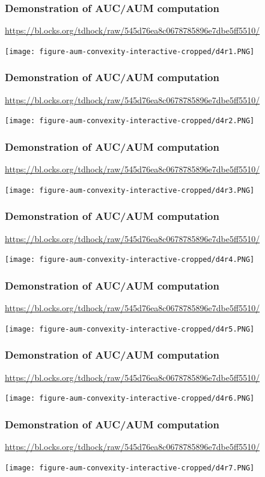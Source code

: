 \documentclass[t]{beamer}
\begin{document}
\begin{frame}
  \frametitle{Demonstration of AUC/AUM computation}
  {\scriptsize\url{https://bl.ocks.org/tdhock/raw/545d76ea8c0678785896e7dbe5ff5510/}}

  \texttt{[image: figure-aum-convexity-interactive-cropped/d4r1.PNG]}
\end{frame}

\begin{frame}
  \frametitle{Demonstration of AUC/AUM computation}
  {\scriptsize\url{https://bl.ocks.org/tdhock/raw/545d76ea8c0678785896e7dbe5ff5510/}}

  \texttt{[image: figure-aum-convexity-interactive-cropped/d4r2.PNG]}
\end{frame}

\begin{frame}
  \frametitle{Demonstration of AUC/AUM computation}
  {\scriptsize\url{https://bl.ocks.org/tdhock/raw/545d76ea8c0678785896e7dbe5ff5510/}}

  \texttt{[image: figure-aum-convexity-interactive-cropped/d4r3.PNG]}
\end{frame}

\begin{frame}
  \frametitle{Demonstration of AUC/AUM computation}
  {\scriptsize\url{https://bl.ocks.org/tdhock/raw/545d76ea8c0678785896e7dbe5ff5510/}}

  \texttt{[image: figure-aum-convexity-interactive-cropped/d4r4.PNG]}
\end{frame}

\begin{frame}
  \frametitle{Demonstration of AUC/AUM computation}
  {\scriptsize\url{https://bl.ocks.org/tdhock/raw/545d76ea8c0678785896e7dbe5ff5510/}}

  \texttt{[image: figure-aum-convexity-interactive-cropped/d4r5.PNG]}
\end{frame}

\begin{frame}
  \frametitle{Demonstration of AUC/AUM computation}
  {\scriptsize\url{https://bl.ocks.org/tdhock/raw/545d76ea8c0678785896e7dbe5ff5510/}}

  \texttt{[image: figure-aum-convexity-interactive-cropped/d4r6.PNG]}
\end{frame}

\begin{frame}
  \frametitle{Demonstration of AUC/AUM computation}
  {\scriptsize\url{https://bl.ocks.org/tdhock/raw/545d76ea8c0678785896e7dbe5ff5510/}}

  \texttt{[image: figure-aum-convexity-interactive-cropped/d4r7.PNG]}
\end{frame}
\end{document}
